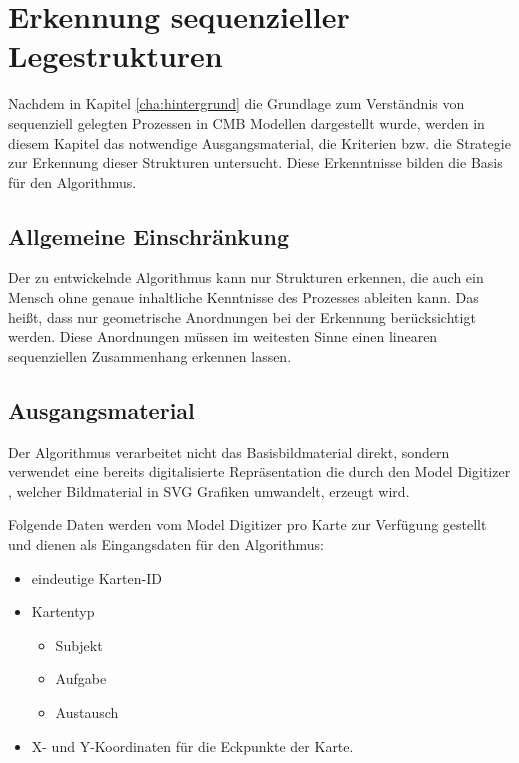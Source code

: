 %
%
% 
% 
% 

\chapter{Erkennung sequenzieller Legestrukturen} %
\label{cha:erkennung}
Nachdem in Kapitel \ref{cha:hintergrund} die Grundlage zum Verständnis von sequenziell gelegten Prozessen in CMB Modellen  dargestellt wurde, werden in diesem Kapitel das notwendige Ausgangsmaterial, die Kriterien bzw. die Strategie zur Erkennung dieser Strukturen untersucht. Diese Erkenntnisse bilden die Basis für den Algorithmus.

\section{Allgemeine Einschränkung} %
\label{sec:allgmeine_einschrankung}
Der zu entwickelnde Algorithmus kann nur Strukturen erkennen, die auch ein Mensch ohne genaue inhaltliche Kenntnisse des Prozesses ableiten kann. Das heißt, dass nur geometrische Anordnungen bei der Erkennung berücksichtigt werden. Diese Anordnungen müssen im weitesten Sinne einen linearen sequenziellen Zusammenhang erkennen lassen.

\section{Ausgangsmaterial} %
\label{sec:ausgangsmeterial}
Der Algorithmus verarbeitet nicht das Basisbildmaterial direkt, sondern verwendet eine bereits digitalisierte Repräsentation die durch den Model Digitizer \cite{opplstary2017}, welcher Bildmaterial in SVG Grafiken umwandelt, erzeugt wird.

Folgende Daten werden vom Model Digitizer pro Karte zur Verfügung gestellt und dienen als Eingangsdaten für den Algorithmus:
\begin{itemize}
	\item eindeutige Karten-ID
	\item Kartentyp
	\begin{itemize}
		\item Subjekt
		\item Aufgabe
		\item Austausch
	\end{itemize}
	\item X- und Y-Koordinaten für die Eckpunkte der Karte. 
\end{itemize}

